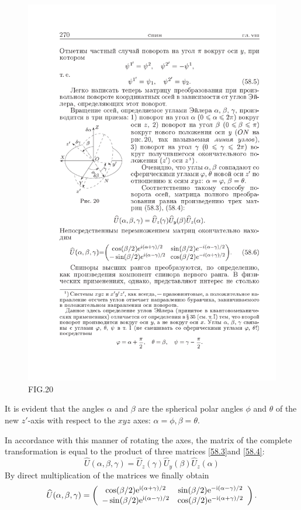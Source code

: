 \begin{figure}
	\includegraphics[scale=1.2]{fig}\caption{FIG.20}\label{Fig.20}
\end{figure}







It is evident that the angles $\alpha$ and $\beta$ are the spherical polar angles $\phi$ and $\theta$ of the new $ z' $-axis with respect to the $ xyz $ axes: $ \alpha = \phi, \beta = \theta $.

In accordance with this manner of rotating the axes, the matrix of the complete transformation is equal to the product of three matrices \eqref{58.3}and \eqref{58.4}:
\[ \hat{U}(\alpha,\beta,\gamma)=\hat{U}_z(\gamma)\hat{U}_y(\beta)\hat{U}_z(\alpha) \]
By direct multiplication of the matrices we finally obtain
\begin{equation}\label{58.6}
\widehat{U}(\alpha,\beta,\gamma)=\left( \begin{array}{cc}
\cos(\beta/2)\mathrm{e}^{\mathrm{i}(\alpha+\gamma)/2}&\sin(\beta/2)\mathrm{e}^{-\mathrm{i}(\alpha-\gamma)/2}\\
-\sin(\beta/2)\mathrm{e}^{\mathrm{i}(\alpha-\gamma)/2}&\cos(\beta/2)\mathrm{e}^{-\mathrm{i}(\alpha+\gamma)/2}
\end{array}\right).
\end{equation}



